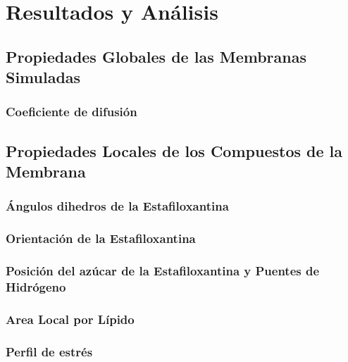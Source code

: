 \chapter{Resultados y An\'{a}lisis}
\section{Propiedades Globales de las Membranas Simuladas}
\subsection{Coeficiente de difusi\'{o}n}
\section{Propiedades Locales de los Compuestos de la Membrana}
\subsection{\'{A}ngulos dihedros de la Estafiloxantina}
\subsection{Orientaci\'{o}n de la Estafiloxantina}
\subsection{Posici\'{o}n del az\'{u}car  de la Estafiloxantina y Puentes de Hidr\'{o}geno}
\subsection{Area Local por L\'{i}pido}
\subsection{Perfil de estr\'{e}s}



